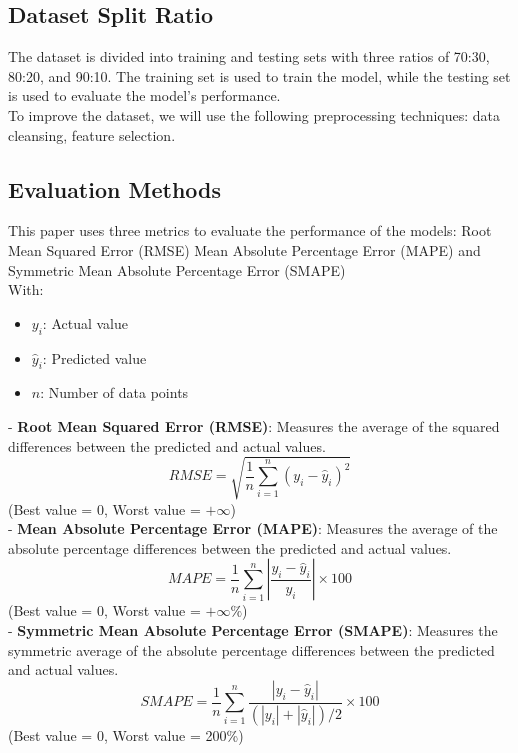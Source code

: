 \documentclass{ieeeojies}
\begin{document}
\subsection {Dataset Split Ratio}
The dataset is divided into training and testing sets with three ratios of 70:30, 80:20, and 90:10. The training set is used to train the model, while the testing set is used to evaluate the model's performance.\\
To improve the dataset, we will use the following preprocessing techniques: data cleansing, feature selection.
\subsection {Evaluation Methods}
This paper uses three metrics to evaluate the performance of the models: Root Mean Squared Error (RMSE) Mean Absolute Percentage Error (MAPE) and Symmetric Mean Absolute Percentage Error (SMAPE)\\
With:
\begin{itemize}
    \item \(y_i\): Actual value
    \item \(\hat{y}_i\): Predicted value
    \item \(n\): Number of data points
\end{itemize}
\noindent
- \textbf{Root Mean Squared Error (RMSE)}: Measures the average of the squared differences between the predicted and actual values.
    \begin{dmath*}
        RMSE = \sqrt{\frac{1}{n} \sum_{i=1}^{n} (y_i - \hat{y}_i)^2}
    \end{dmath*}
    (Best value = 0, Worst value = \(+\infty\))\\
\noindent
- \textbf{Mean Absolute Percentage Error (MAPE)}: Measures the average of the absolute percentage differences between the predicted and actual values.
    \begin{dmath*}
        MAPE = \frac{1}{n} \sum_{i=1}^{n} \left| \frac{y_i - \hat{y}_i}{y_i} \right| \times 100
    \end{dmath*}
        (Best value = 0, Worst value = \(+\infty\%\))\\
\noindent
- \textbf{Symmetric Mean Absolute Percentage Error (SMAPE)}: Measures the symmetric average of the absolute percentage differences between the predicted and actual values.
    \begin{dmath*}
        SMAPE = \frac{1}{n} \sum_{i=1}^{n} \frac{\left| y_i - \hat{y}_i \right|}{\left( \left| y_i \right| + \left| \hat{y}_i \right| \right)/2} \times 100
    \end{dmath*}
    (Best value = 0, Worst value = 200\%)\\
\end{document}
